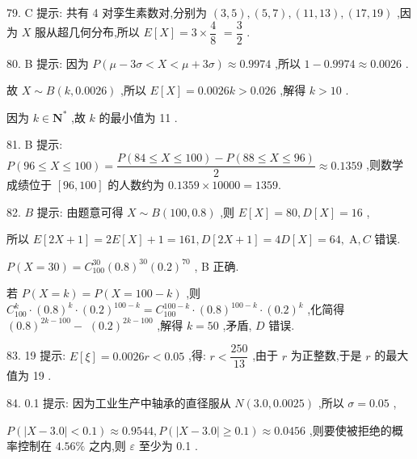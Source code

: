 79. C 提示: 共有 4 对孪生素数对,分别为 $\left( {3,5}\right) ,\left( {5,7}\right) ,\left( {{11},{13}}\right) ,\left( {{17},{19}}\right)$ ,因为 $X$ 服从超几何分布,所以 $E\left\lbrack  X\right\rbrack   = 3 \times  \dfrac{4}{8}$  $= \dfrac{3}{2}$ .

80. B 提示: 因为 $P\left( {\mu  - {3\sigma } < X < \mu  + {3\sigma }}\right)  \approx  {0.9974}$ ,所以 $1 - {0.9974} \approx  {0.0026}$ .

故 $X \sim  B\left( {k,{0.0026}}\right)$ ,所以 $E\left\lbrack  X\right\rbrack   = {0.0026k} > {0.026}$ ,解得 $k > {10}$ .

因为 $k \in  {\mathbf{N}}^{ * }$ ,故 $k$ 的最小值为 11 .

81. B 提示: $P\left( {{96} \leq  X \leq  {100}}\right)  = \dfrac{P\left( {{84} \leq  X \leq  {100}}\right)  - P\left( {{88} \leq  X \leq  {96}}\right) }{2} \approx  {0.1359}$ ,则数学成绩位于 $\left\lbrack  {{96},{100}}\right\rbrack$ 的人数约为 ${0.1359} \times  {10000} = {1359}.$

82. $B$ 提示: 由题意可得 $X \sim  B\left( {{100},{0.8}}\right)$ ,则 $E\left\lbrack  X\right\rbrack   = {80},D\left\lbrack  X\right\rbrack   = {16}$ ,

所以 $E\left\lbrack  {{2X} + 1}\right\rbrack   = {2E}\left\lbrack  X\right\rbrack   + 1 = {161},D\left\lbrack  {{2X} + 1}\right\rbrack   = {4D}\left\lbrack  X\right\rbrack   = {64},\mathrm{\;A},C$ 错误.

$P\left( {X = {30}}\right)  = {C}_{100}^{30}{\left( {0.8}\right) }^{30}{\left( {0.2}\right) }^{70}$ , B 正确.

若 $P\left( {X = k}\right)  = P\left( {X = {100} - k}\right)$ ,则 ${C}_{100}^{k} \cdot  {\left( {0.8}\right) }^{k} \cdot  {\left( {0.2}\right) }^{{100} - k} = {C}_{100}^{{100} - k} \cdot  {\left( {0.8}\right) }^{{100} - k} \cdot  {\left( {0.2}\right) }^{k}$ ,化简得 ${\left( {0.8}\right) }^{{2k} - {100}} -$  ${\left( {0.2}\right) }^{{2k} - {100}}$ ,解得 $k = {50}$ ,矛盾, $D$ 错误.

83. 19 提示: $E\left\lbrack  \xi \right\rbrack   = {0.0026r} < {0.05}$ ,得: $r < \dfrac{250}{13}$ ,由于 $r$ 为正整数,于是 $r$ 的最大值为 19 .

84. 0.1 提示: 因为工业生产中轴承的直径服从 $N\left( {{3.0},{0.0025}}\right)$ ,所以 $\sigma  = {0.05}$ ,

$P\left( {\left| {X - {3.0}}\right|  < {0.1}}\right)  \approx  {0.9544},P\left( {\left| {X - {3.0}}\right|  \geq  {0.1}}\right)  \approx  {0.0456}$ ,则要使被拒绝的概率控制在 ${4.56}\%$ 之内,则 $\varepsilon$ 至少为 0.1 .

